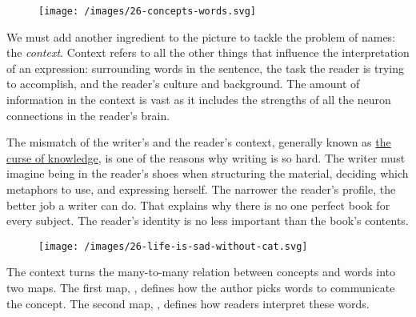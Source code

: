 \documentclass{article}
\begin{document}
\begin{figure}[grayscale-diagram,medium-size]
  \texttt{[image: /images/26-concepts-words.svg]}
\end{figure}

We must add another ingredient to the picture to tackle the problem of names: the \emph{context}.
Context refers to all the other things that influence the interpretation of an expression: surrounding words in the sentence, the task the reader is trying to accomplish, and the reader's culture and background.
The amount of information in the context is vast as it includes the strengths of all the neuron connections in the reader's brain.

The mismatch of the writer's and the reader's context, generally known as \href{https://en.wikipedia.org/wiki/Curse_of_knowledge}{the curse of knowledge}, is one of the reasons why writing is so hard.
The writer must imagine being in the reader's shoes when structuring the material, deciding which metaphors to use, and expressing herself.
The narrower the reader's profile, the better job a writer can do.
That explains why there is no one perfect book for every subject.
The reader's identity is no less important than the book's contents.

\begin{figure}[grayscale-diagram,medium-size]
  \texttt{[image: /images/26-life-is-sad-without-cat.svg]}
\end{figure}

The context turns the many-to-many relation between concepts and words into two maps.
The first map, , defines how the author picks words to communicate the concept.
The second map, , defines how readers interpret these words.
\end{document}
